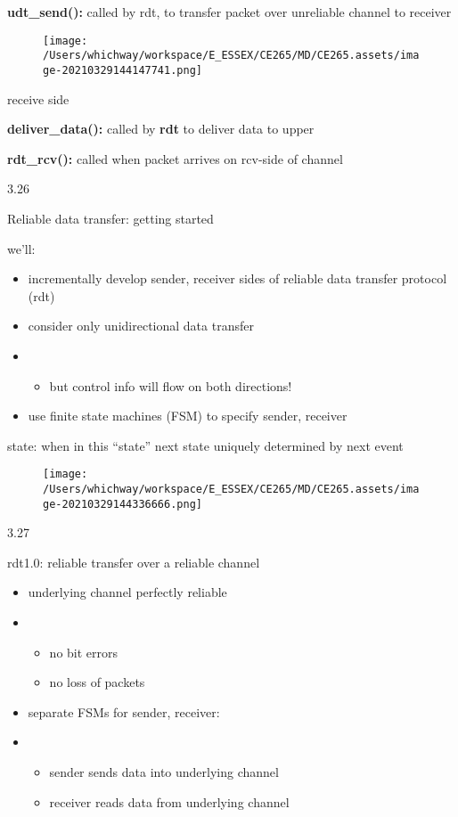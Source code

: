 \documentclass[
]{article}
\begin{document}
\textbf{udt\_send():} called by rdt, to transfer packet over unreliable
channel to receiver

\begin{figure}
\centering
\texttt{[image: /Users/whichway/workspace/E\_ESSEX/CE265/MD/CE265.assets/image-20210329144147741.png]}
\caption{}
\end{figure}

receive side

\textbf{deliver\_data():} called by \textbf{rdt} to deliver data to
upper

\textbf{rdt\_rcv():} called when packet arrives on rcv-side of channel

3.26

Reliable data transfer: getting started

we'll:

\begin{itemize}
\item
  incrementally develop sender, receiver sides of reliable data transfer
  protocol (rdt)
\item
  consider only unidirectional data transfer
\item
  \begin{itemize}
  \item
    but control info will flow on both directions!
  \end{itemize}
\item
  use finite state machines (FSM) to specify sender, receiver
\end{itemize}

state: when in this ``state'' next state uniquely determined by next
event

\begin{figure}
\centering
\texttt{[image: /Users/whichway/workspace/E\_ESSEX/CE265/MD/CE265.assets/image-20210329144336666.png]}
\caption{}
\end{figure}

3.27

rdt1.0: reliable transfer over a reliable channel

\begin{itemize}
\item
  underlying channel perfectly reliable
\item
  \begin{itemize}
  \item
    no bit errors
  \item
    no loss of packets
  \end{itemize}
\item
  separate FSMs for sender, receiver:
\item
  \begin{itemize}
  \item
    sender sends data into underlying channel
  \item
    receiver reads data from underlying channel
  \end{itemize}
\end{itemize}
\end{document}
